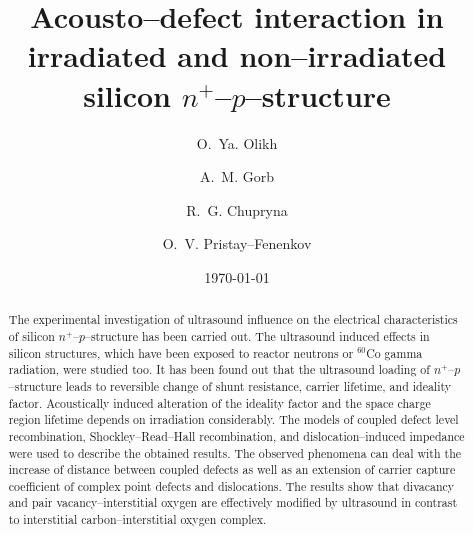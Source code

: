 \documentclass[aip,jap, amsmath,amssymb,reprint]{revtex4-1}
\begin{document}

\title{Acousto--defect interaction in irradiated and non--irradiated silicon $n^+$--$p$--structure}
\author{O.~Ya. Olikh}


\author{A.~M. Gorb}


\author{R.~G. Chupryna}

\author{O.~V. Pristay--Fenenkov}%





\date{\today}

\begin{abstract}
The experimental investigation of ultrasound influence on the electrical characteristics of silicon $n^+$--$p$--structure has been carried out.
The ultrasound induced effects in silicon structures, which have been exposed to reactor neutrons or $^{60}$Co gamma radiation, were studied too.
It has been found out that the ultrasound loading of $n^+$--$p$--structure leads to reversible change of shunt resistance, carrier lifetime, and  ideality factor.
Acoustically induced alteration of the ideality factor and the space charge region lifetime depends on irradiation considerably.
The models of coupled defect level recombination, Shockley--Read--Hall recombination, and dislocation--induced impedance were used to describe the obtained results.
The observed phenomena can deal with the increase of distance between coupled defects as well as an extension of carrier capture coefficient of complex point defects and dislocations.
The results show that divacancy and pair vacancy--interstitial oxygen are effectively modified by ultrasound in contrast to interstitial carbon--interstitial oxygen complex.
\end{abstract}


\maketitle %
\end{document}

